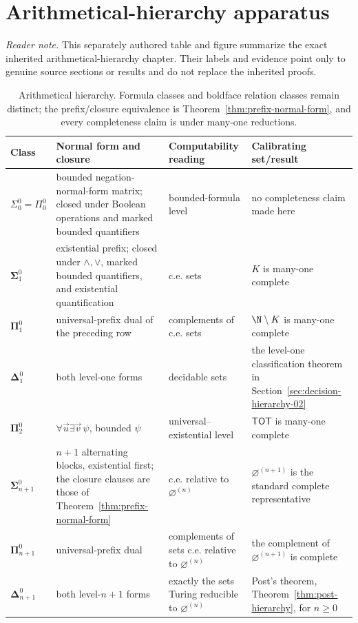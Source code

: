 
\section*{Arithmetical-hierarchy apparatus}
\noindent\textit{Reader note.}
This separately authored table and figure summarize the exact inherited
arithmetical-hierarchy chapter.  Their labels and evidence point only to
genuine source sections or results and do not replace the inherited proofs.

\begin{table}[htbp]
\centering
\scriptsize
\begin{tabular}{@{}p{.12\linewidth}p{.27\linewidth}p{.24\linewidth}p{.27\linewidth}@{}}
\toprule
Class & Normal form and closure & Computability reading & Calibrating set/result \\
\midrule
\(\Sigma^0_0=\Pi^0_0\) & bounded negation-normal-form matrix; closed under
Boolean operations and marked bounded quantifiers & bounded-formula level & no
completeness claim made here \\
\(\boldsymbol\Sigma^0_1\) & existential prefix; closed under
\(\land,\lor\), marked bounded quantifiers, and existential quantification &
c.e. sets & \(K\) is many-one complete \\
\(\boldsymbol\Pi^0_1\) & universal-prefix dual of the preceding row &
complements of c.e. sets & \(\N\setminus K\) is many-one complete \\
\(\boldsymbol\Delta^0_1\) & both level-one forms & decidable sets &
the level-one classification theorem in Section~\ref{sec:decision-hierarchy-02} \\
\(\boldsymbol\Pi^0_2\) & \(\forall\vec u\exists\vec v\,\psi\), bounded
\(\psi\) & universal--existential level & \(\mathsf{TOT}\) is many-one
complete \\
\(\boldsymbol\Sigma^0_{n+1}\) & \(n+1\) alternating blocks, existential
first; the closure clauses are those of
Theorem~\ref{thm:prefix-normal-form} & c.e. relative to
\(\varnothing^{(n)}\) & \(\varnothing^{(n+1)}\) is the standard complete
representative \cite{Shoenfield1967} \\
\(\boldsymbol\Pi^0_{n+1}\) & universal-prefix dual & complements of sets c.e.
relative to \(\varnothing^{(n)}\) & the complement of
\(\varnothing^{(n+1)}\) is complete \cite{Shoenfield1967} \\
\(\boldsymbol\Delta^0_{n+1}\) & both level-\(n+1\) forms & exactly the sets
Turing reducible to \(\varnothing^{(n)}\) &
Post's theorem, Theorem~\ref{thm:post-hierarchy}, for \(n\geq0\) \\
\bottomrule
\end{tabular}
\caption{Arithmetical hierarchy.  Formula classes and
boldface relation classes remain distinct; the prefix/closure equivalence is
Theorem~\ref{thm:prefix-normal-form}, and every completeness claim is
under many-one reductions.}
\label{tab:p04-arithmetical-hierarchy}
\end{table}

